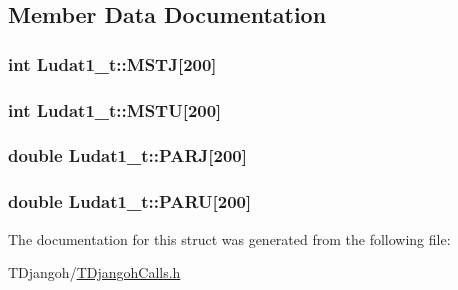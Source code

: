\subsection{Member Data Documentation}
\hypertarget{struct_ludat1__t_ab47d0cbcea897c1d7f6993c63d8fb1d8}{
\subsubsection[{M\+S\+T\+J}]{\setlength{\rightskip}{0pt plus 5cm}int Ludat1\+\_\+t\+::\+M\+S\+T\+J\mbox{[}200\mbox{]}}}\label{struct_ludat1__t_ab47d0cbcea897c1d7f6993c63d8fb1d8}
\hypertarget{struct_ludat1__t_ae01a3aee4bb22a760e8ea252207e2cd4}{
\subsubsection[{M\+S\+T\+U}]{\setlength{\rightskip}{0pt plus 5cm}int Ludat1\+\_\+t\+::\+M\+S\+T\+U\mbox{[}200\mbox{]}}}\label{struct_ludat1__t_ae01a3aee4bb22a760e8ea252207e2cd4}
\hypertarget{struct_ludat1__t_a3c1647b2c9d49467b84324857e22daaf}{
\subsubsection[{P\+A\+R\+J}]{\setlength{\rightskip}{0pt plus 5cm}double Ludat1\+\_\+t\+::\+P\+A\+R\+J\mbox{[}200\mbox{]}}}\label{struct_ludat1__t_a3c1647b2c9d49467b84324857e22daaf}
\hypertarget{struct_ludat1__t_acde27cfd0ebacc6b76cdcb339044c627}{
\subsubsection[{P\+A\+R\+U}]{\setlength{\rightskip}{0pt plus 5cm}double Ludat1\+\_\+t\+::\+P\+A\+R\+U\mbox{[}200\mbox{]}}}\label{struct_ludat1__t_acde27cfd0ebacc6b76cdcb339044c627}


The documentation for this struct was generated from the following file\+:\begin{DoxyCompactItemize}
\item 
T\+Djangoh/\hyperlink{_t_djangoh_calls_8h}{T\+Djangoh\+Calls.\+h}\end{DoxyCompactItemize}
